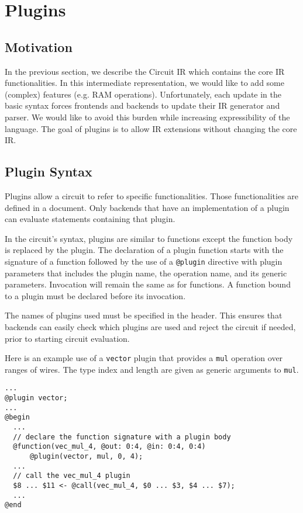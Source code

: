 \section{Plugins}
\label{sec:plugins}

\subsection{Motivation}

In the previous section, we describe the Circuit IR which contains the core IR functionalities.
In this intermediate representation, we would like to add some (complex) features (e.g. RAM operations).
Unfortunately, each update in the basic syntax forces frontends and backends to update their IR generator and parser.
We would like to avoid this burden while increasing expressibility of the language.
The goal of plugins is to allow IR extensions without changing the core IR.

\subsection{Plugin Syntax}
Plugins allow a circuit to refer to specific functionalities.
Those functionalities are defined in a document.
Only backends that have an implementation of a plugin can evaluate statements containing that plugin.

In the circuit's syntax, plugins are similar to functions except the function body is replaced by the plugin.
The declaration of a plugin function starts with the signature of a function followed by the use of a \texttt{@plugin} directive with plugin parameters that includes the plugin name, the operation name, and its generic parameters.
Invocation will remain the same as for functions.
A function bound to a plugin must be declared before its invocation.

The names of plugins used
must be specified in the header.
This ensures that backends can easily check which plugins are used and reject the circuit if needed, prior to starting circuit evaluation.

 Here is an example use of a \texttt{vector} plugin that provides a \texttt{mul} operation over ranges of wires.
 The type index and length are given as generic arguments to \texttt{mul}. 
\begin{lstlisting}[language=ir]
...
@plugin vector;
...
@begin
  ...
  // declare the function signature with a plugin body
  @function(vec_mul_4, @out: 0:4, @in: 0:4, 0:4)
      @plugin(vector, mul, 0, 4);
  ...
  // call the vec_mul_4 plugin
  $8 ... $11 <- @call(vec_mul_4, $0 ... $3, $4 ... $7);
  ...
@end
\end{lstlisting}

